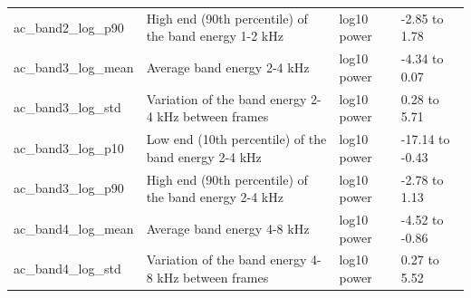 \documentclass[11pt,a4paper]{article}
\begin{document}
\begin{center}
\begin{longtable}{>{\raggedright\arraybackslash}p{3.70cm}>{\raggedright\arraybackslash}p{6.65cm}>{\raggedright\arraybackslash}p{1.90cm}>{\raggedright\arraybackslash}p{2.56cm}}
\hspace{0pt}ac\_\allowbreak{}band2\_\allowbreak{}log\_\allowbreak{}p90 & \hspace{0pt}High end (90th percentile) of the band energy 1-2 kHz & \hspace{0pt}log10 power & \hspace{0pt}-2.85 to 1.78\\
\hspace{0pt}ac\_\allowbreak{}band3\_\allowbreak{}log\_\allowbreak{}mean & \hspace{0pt}Average band energy 2-4 kHz & \hspace{0pt}log10 power & \hspace{0pt}-4.34 to 0.07\\
\hspace{0pt}ac\_\allowbreak{}band3\_\allowbreak{}log\_\allowbreak{}std & \hspace{0pt}Variation of the band energy 2-4 kHz between frames & \hspace{0pt}log10 power & \hspace{0pt}0.28 to 5.71\\
\hspace{0pt}ac\_\allowbreak{}band3\_\allowbreak{}log\_\allowbreak{}p10 & \hspace{0pt}Low end (10th percentile) of the band energy 2-4 kHz & \hspace{0pt}log10 power & \hspace{0pt}-17.14 to -0.43\\
\hspace{0pt}ac\_\allowbreak{}band3\_\allowbreak{}log\_\allowbreak{}p90 & \hspace{0pt}High end (90th percentile) of the band energy 2-4 kHz & \hspace{0pt}log10 power & \hspace{0pt}-2.78 to 1.13\\
\hspace{0pt}ac\_\allowbreak{}band4\_\allowbreak{}log\_\allowbreak{}mean & \hspace{0pt}Average band energy 4-8 kHz & \hspace{0pt}log10 power & \hspace{0pt}-4.52 to -0.86\\
\hspace{0pt}ac\_\allowbreak{}band4\_\allowbreak{}log\_\allowbreak{}std & \hspace{0pt}Variation of the band energy 4-8 kHz between frames & \hspace{0pt}log10 power & \hspace{0pt}0.27 to 5.52\\

\end{longtable}
\end{center}
\end{document}
